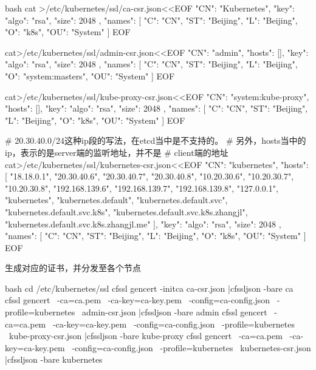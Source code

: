 \begin{outline}[enumerate]
\begin{code-block}{bash}
cat >/etc/kubernetes/ssl/ca-csr.json<<EOF
{
    "CN": "Kubernetes",
    "key": {
        "algo": "rsa",
        "size": 2048
    },
    "names": [
        {
            "C": "CN",
            "ST": "Beijing",
            "L": "Beijing",
            "O": "k8s",
            "OU": "System"
        }
    ]
}
EOF

cat>/etc/kubernetes/ssl/admin-csr.json<<EOF
{
    "CN": "admin",
    "hosts": [],
    "key": {
        "algo": "rsa",
        "size": 2048
    },
    "names": [
        {
            "C": "CN",
            "ST": "Beijing",
            "L": "Beijing",
            "O": "system:masters",
            "OU": "System"
        }
    ]
}
EOF

cat>/etc/kubernetes/ssl/kube-proxy-csr.json<<EOF
{
    "CN": "system:kube-proxy",
    "hosts": [],
    "key": {
        "algo": "rsa",
        "size": 2048
    },
    "names": [
        {
            "C": "CN",
            "ST": "Beijing",
            "L": "Beijing",
            "O": "k8s",
            "OU": "System"
        }
    ]
}
EOF

# 20.30.40.0/24这种ip段的写法，在etcd当中是不支持的。
# 另外，hosts当中的ip，表示的是server端的监听地址，并不是
# client端的地址
cat>/etc/kubernetes/ssl/kubernetes-csr.json<<EOF
{
    "CN": "kubernetes",
    "hosts": [
        "18.18.0.1",
        "20.30.40.6",
        "20.30.40.7",
        "20.30.40.8",
        "10.20.30.6",
        "10.20.30.7",
        "10.20.30.8",
        "192.168.139.6",
        "192.168.139.7",
        "192.168.139.8",
        "127.0.0.1",
        "kubernetes",
        "kubernetes.default",
        "kubernetes.default.svc",
        "kubernetes.default.svc.k8s",
        "kubernetes.default.svc.k8s.zhangjl",
        "kubernetes.default.svc.k8s.zhangjl.me"
    ],
    "key": {
        "algo": "rsa",
        "size": 2048
    },
    "names": [
        {
            "C": "CN",
            "ST": "Beijing",
            "L": "Beijing",
            "O": "k8s",
            "OU": "System"
        }
    ]
}
EOF

\end{code-block}
生成对应的证书，并分发至各个节点
\begin{code-block}{bash}
cd /etc/kubernetes/ssl
cfssl gencert -initca ca-csr.json |cfssljson -bare ca
cfssl gencert \
      -ca=ca.pem \
      -ca-key=ca-key.pem \
      -config=ca-config.json \
      -profile=kubernetes \
      admin-csr.json |cfssljson -bare admin
cfssl gencert \
      -ca=ca.pem \
      -ca-key=ca-key.pem \
      -config=ca-config.json \
      -profile=kubernetes \
      kube-proxy-csr.json |cfssljson -bare kube-proxy
cfssl gencert \
      -ca=ca.pem \
      -ca-key=ca-key.pem \
      -config=ca-config.json \
      -profile=kubernetes \
      kubernetes-csr.json |cfssljson -bare kubernetes


\end{code-block}
\end{outline}
